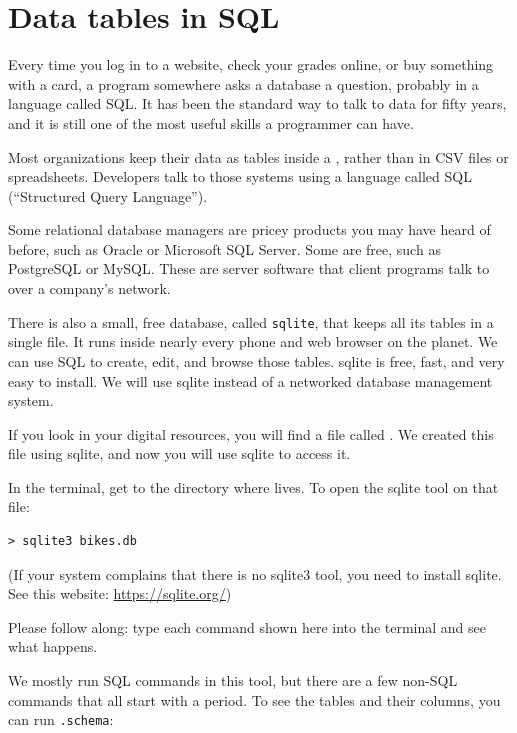 \chapter{Data tables in SQL}

Every time you log in to a website, check your grades online, or buy
something with a card, a program somewhere asks a database a question,
probably in a language called SQL. It has been the standard way to talk
to data for fifty years, and it is still one of the most useful skills a
programmer can have.

Most organizations keep their data as tables
inside a , rather than in
CSV files or spreadsheets. Developers talk to those systems using a
language called SQL (``Structured Query Language'').

Some relational database managers are pricey products you may have
heard of before, such as Oracle or Microsoft SQL Server. Some are free, such as
PostgreSQL or MySQL. These are server software that client programs
talk to over a company's network.

There is also a small, free database, called \texttt{sqlite}, that keeps
all its tables in a single file. It runs inside nearly every phone and web
browser on the planet. We can use SQL to create, edit, and browse those tables.
sqlite is free, fast, and very easy to install. We will use sqlite
instead of a networked database management system.

If you look in your digital resources, you will find a file called
. We created this file using sqlite, and now you
will use sqlite to access it.

In the terminal, get to the directory where  lives. To open the sqlite tool on that file:

\begin{verbatim}
> sqlite3 bikes.db
\end{verbatim}

(If your system complains that there is no sqlite3 tool, you need to install sqlite. See this website: \url{https://sqlite.org/})

Please follow along: type each command shown here into the terminal
and see what happens.

We mostly run SQL commands in this tool, but there are a few non-SQL
 commands that all start with a period. To see the tables and their
 columns, you can run \texttt{.schema}:

